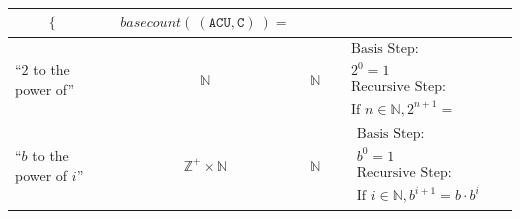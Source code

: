 \documentclass[12pt, oneside]{article}
\newcommand{\A}[0]{\texttt{A}}
\newcommand{\C}[0]{\texttt{C}}
\newcommand{\U}[0]{\texttt{U}}
\begin{document}
\begin{center}
\begin{tabular}{p{0.65in}ccp{2.4in}p{2.4in}}
{\begin{align*}
\begin{cases}
    \end{cases}
    \end{align*}} & 
    {\begin{align*}
        basecount(~(\A\C\U, \C)~) = 
    \end{align*}}\\
\hline
``$2$ to the power of''& $\mathbb{N}$ & $\mathbb{N}$ & 
{\begin{align*}    
&\textrm{Basis Step:} \\
&2^0= 1 \\
&\textrm{Recursive Step:}\\
&\textrm{If } n \in \mathbb{N}, 2^{n+1} = \phantom{2 \cdot 2^n}
\end{align*}}\\
\hline
``$b$ to the power of $i$''& $\mathbb{Z}^+ \times \mathbb{N}$ & $\mathbb{N}$ & 
{\begin{align*}    
&\textrm{Basis Step:} \\
&b^0 = 1 \\
&\textrm{Recursive Step:}\\
&\textrm{If } i \in \mathbb{N}, b^{i+1} = b \cdot b^i
\end{align*}}
\end{tabular}
\end{center}

\newpage \vfill
\end{document}

